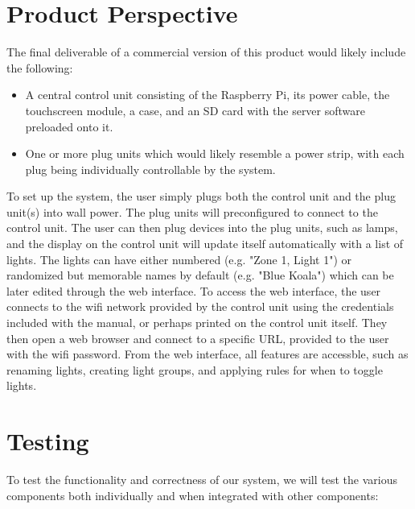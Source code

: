 \documentclass[oneside,openright]{book}
\begin{document}
\section{Product Perspective}

The final deliverable of a commercial version of this product would likely include the following:

\begin{itemize}
    \item A central control unit consisting of the Raspberry Pi, its power
cable, the touchscreen module, a case, and an SD card with the server software
preloaded onto it.
    \item One or more plug units which would likely resemble a power strip,
with each plug being individually controllable by the system.
\end{itemize}

To set up the system, the user simply plugs both the control unit and the plug
unit(s) into wall power.  The plug units will preconfigured to connect to the
control unit.  The user can then plug devices into the plug units, such as
lamps, and the display on the control unit will update itself automatically
with a list of lights.  The lights can have either numbered (e.g. "Zone 1,
Light 1") or randomized but memorable names by default (e.g. "Blue Koala")
which can be later edited through the web interface.  To access the web
interface, the user connects to the wifi network provided by the control unit
using the credentials included with the manual, or perhaps printed on the
control unit itself.  They then open a web browser and connect to a specific
URL, provided to the user with the wifi password.  From the web interface, all
features are accessble, such as renaming lights, creating light groups, and
applying rules for when to toggle lights.

\section{Testing}

To test the functionality and correctness of our system, we will test the various components both individually and when integrated with other components:
\end{document}
